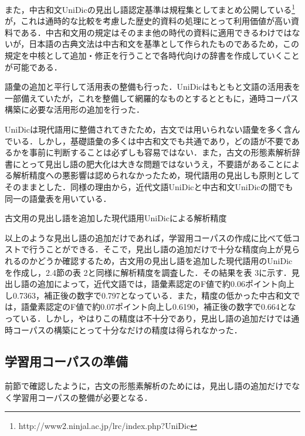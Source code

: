 \documentclass[japanese]{jnlp_1.4}
\begin{document}
また，中古和文UniDicの見出し語認定基準は規程集としてまとめ公開している\cite{小椋2012}\footnote{http://www2.ninjal.ac.jp/lrc/index.php?UniDic} が，これは通時的な比較を考慮した歴史的資料の処理にとって利用価値が高い資料である．中古和文用の規定はそのまま他の時代の資料に適用できるわけではないが，日本語の古典文法は中古和文を基準として作られたものであるため，この規定を中核として追加・修正を行うことで各時代向けの辞書を作成していくことが可能である．

語彙の追加と平行して活用表の整備も行った．UniDicはもともと文語の活用表を一部備えていたが，これを整備して網羅的なものとするとともに，通時コーパス構築に必要な活用形の追加を行った． 

UniDicは現代語用に整備されてきたため，古文では用いられない語彙を多く含んでいる．しかし，基礎語彙の多くは中古和文でも共通であり，どの語が不要であるかを事前に判断することは必ずしも容易ではない．また，古文の形態素解析辞書にとって見出し語の肥大化は大きな問題ではないうえ，不要語があることによる解析精度への悪影響は認められなかったため，現代語用の見出しも原則としてそのままとした．同様の理由から，近代文語UniDicと中古和文UniDicの間でも同一の語彙表を用いている．

\begin{table}[b]
\caption{古文用の見出し語を追加した現代語用UniDicによる解析精度}
\label{tab3}

\end{table}

以上のような見出し語の追加だけであれば，学習用コーパスの作成に比べて低コストで行うことができる．そこで，見出し語の追加だけで十分な精度向上が見られるのかどうか確認するため，古文用の見出し語を追加した現代語用のUniDicを作成し，2.4節の表 2と同様に解析精度を調査した．その結果を表 3に示す．見出し語の追加によって，近代文語では，語彙素認定のF値で約0.06ポイント向上し0.7363，補正後の数字で0.797となっている．また，精度の低かった中古和文では，語彙素認定のF値で約0.07ポイント向上し0.6190，補正後の数字で0.664となっている．しかし，やはりこの精度は不十分であり，見出し語の追加だけでは通時コーパスの構築にとって十分なだけの精度は得られなかった．


\subsection{学習用コーパスの準備}

前節で確認したように，古文の形態素解析のためには，見出し語の追加だけでなく学習用コーパスの整備が必要となる．
\end{document}
